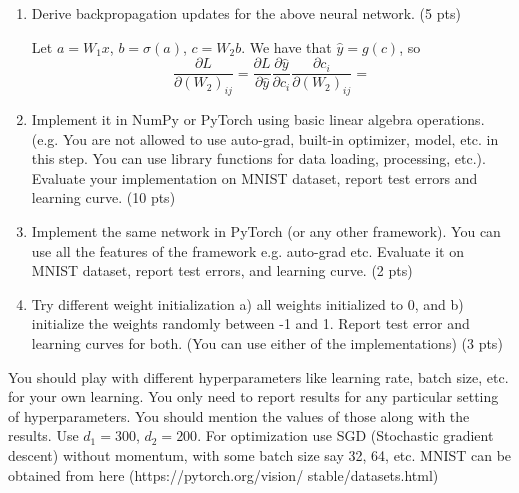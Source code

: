\documentclass[a4paper]{article}
\theoremstyle{definition}
\newenvironment{soln}{
    \leavevmode\color{blue}\ignorespaces
}{}
\begin{document}
\begin{enumerate}
    \item Derive backpropagation updates for the above neural network. (5 pts)

\begin{soln}
    Let $a=W_1x$, $b=\sigma(a)$, $c=W_2b$. We have that $\hat{y}=g(c)$, so
    \[\frac{\partial L}{\partial (W_2)_{ij}} = \frac{\partial L}{\partial \hat{y}}\frac{\partial \hat{y}}{\partial c_i}\frac{\partial c_i}{\partial (W_2)_{ij}}
    =  \]
\end{soln}

    \item Implement it in NumPy or PyTorch using basic linear algebra operations. (e.g. You are not allowed to use auto-grad, built-in optimizer, model, etc. in this step. You can use library functions for data loading, processing, etc.). Evaluate your implementation on MNIST dataset, report test errors and learning curve. (10 pts)
    \item Implement the same network in PyTorch (or any other framework). You can use all the features of the framework e.g. auto-grad etc. Evaluate it on MNIST dataset, report test errors, and learning curve. (2 pts)
    \item Try different weight initialization a) all weights initialized to 0, and b) initialize the weights randomly between -1 and 1. Report test error and learning curves for both. (You can use either of the implementations) (3 pts)
\end{enumerate}

You should play with different hyperparameters like learning rate, batch size, etc. for your own learning. You only need to report results for any particular setting of hyperparameters. You should mention the values of those along with the results. Use $d_1 = 300$, $d_2 = 200$. For optimization use SGD (Stochastic gradient descent) without momentum, with some batch size say 32, 64, etc. MNIST can be obtained from here (https://pytorch.org/vision/ stable/datasets.html)


\end{document}

